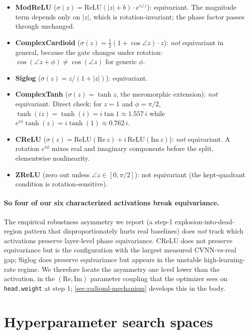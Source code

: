 \documentclass{article}
\providecommand{\Cref}[1]{\autoref{#1}}
\newcommand{\code}[1]{\texttt{#1}}
\begin{document}
\begin{itemize}
  \item \textbf{ModReLU} ($\sigma(z) = \mathrm{ReLU}(|z| + b) \cdot
    e^{i \angle z}$): equivariant. The magnitude term depends only on
    $|z|$, which is rotation-invariant; the phase factor passes through
    unchanged.
  \item \textbf{ComplexCardioid} ($\sigma(z) = \tfrac{1}{2}
    (1 + \cos \angle z) \cdot z$): \emph{not} equivariant in general,
    because the gate changes under rotation:
    $\cos(\angle z + \phi) \neq \cos(\angle z)$ for generic $\phi$.
  \item \textbf{Siglog} ($\sigma(z) = z / (1 + |z|)$): equivariant.
  \item \textbf{ComplexTanh} ($\sigma(z) = \tanh z$, the meromorphic
    extension): \emph{not} equivariant. Direct check: for $z = 1$ and
    $\phi = \pi/2$, $\tanh(iz) = \tanh(i) = i\tan 1 \approx 1.557\,i$
    while $e^{i\phi}\tanh(z) = i\tanh(1) \approx 0.762\,i$.
  \item \textbf{CReLU} ($\sigma(z) = \mathrm{ReLU}(\mathrm{Re}\,z)
    + i\,\mathrm{ReLU}(\mathrm{Im}\,z)$): \emph{not} equivariant. A
    rotation $e^{i\phi}$ mixes real and imaginary components before
    the split, elementwise nonlinearity.
  \item \textbf{ZReLU} (zero out unless $\angle z \in [0, \pi/2]$): not
    equivariant (the kept-quadrant condition is rotation-sensitive).
\end{itemize}

\paragraph{So four of our six characterized activations break equivariance.} The
empirical robustness asymmetry we report (a step-1
explosion-into-dead-region pattern that disproportionately hurts real
baselines) does \emph{not} track which activations preserve layer-level
phase equivariance. CReLU does not preserve equivariance but is the
configuration with the largest measured CVNN-vs-real gap; Siglog does
preserve equivariance but appears in the unstable high-learning-rate regime. We
therefore locate the asymmetry one level lower than the activation, in the
$(\mathrm{Re}, \mathrm{Im})$ parameter coupling that the optimizer sees
on \code{head.weight} at step 1; \Cref{sec:radioml-mechanism}
develops this in the body.

\section{Hyperparameter search spaces}
\label{app:hyperparameters}
\end{document}
